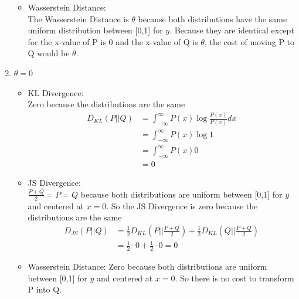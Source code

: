 \documentclass{article}
\begin{document}
\begin{enumerate}[label=\alph*)]
\begin{itemize}
\begin{equation}
\begin{aligned}
                \end{aligned}
            \end{equation}
            \\
            \item Wasserstein Distance: \\ The Wasserstein Distance is $\theta$ because both distributions have the same uniform distribution between [0,1] for $y$. 
            Because they are identical except for the x-value of P is 0 and the x-value of Q is $\theta$, the cost of moving P to Q would be $\theta$.
        \end{itemize}  
    \item $\theta = 0$
        \begin{itemize}
            \item KL Divergence: \\ Zero because the distributions are the same
            \begin{equation}
                \begin{aligned}
                    D_{KL}(P||Q) &= \int_{-\infty}^{\infty} P(x)\log \frac{P(x)}{P(x)}dx\\
                    &= \int_{-\infty}^{\infty} P(x)\log1\\
                    &= \int_{-\infty}^{\infty} P(x) 0 \\
                    &= 0
                \end{aligned}
            \end{equation}
            \item JS Divergence: \\ $\frac{P+Q}{2} = P = Q$ because both distributions are uniform between [0,1] for $y$ and centered at $x = 0$. So the JS Divergence is zero because the distributions are the same
            \begin{equation}
                \begin{aligned}
                    D_{JS}(P||Q) &= \frac{1}{2}D_{KL}(P||\frac{P+Q}{2}) + \frac{1}{2}D_{KL}(Q||\frac{P+Q}{2}) \\
                                 &= \frac{1}{2} \cdot 0 + \frac{1}{2} \cdot 0 = 0
                \end{aligned}
            \end{equation}
            \item Wasserstein Distance: Zero because both distributions are uniform between [0,1] for $y$ and centered at $x = 0$. So there is no cost to transform P into Q.
    

\end{itemize}
\end{enumerate}
\end{document}
